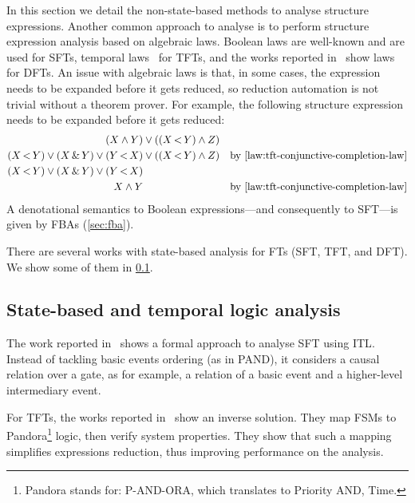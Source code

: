 \documentclass[12pt,openright,twoside,a4paper,oldfontcommands,english,brazil,draft]{abntex2}
\newcommand{\todo}[1]{\adnote{#1}}
\theoremstyle{theo}
\def\pandora{Pandora\footnote{Pandora stands for: P-AND-ORA, which translates to Priority AND, Time.}%
  \gdef\pandora{Pandora\xspace}%
  \xspace}
\newcommand{\parsin}[1]{\ensuremath\left( #1 \right)}
\def\pand{\ensuremath\operatorname{<}}
\def\sand{\ensuremath\operatorname{\&}}
\begin{document}
In this section we detail the non-state-based methods to analyse structure expressions.
Another common approach to analyse  is to perform structure expression analysis based on algebraic laws.
Boolean laws are well-known and are used for \acp{SFT}, temporal laws~\cite{Walker2009,WP2010} for \acp{TFT}, and the works reported in~\cite{Merle2010,MRL2011} show laws for \acp{DFT}.
An issue with algebraic laws is that, in some cases, the expression needs to be expanded before it gets reduced, so reduction automation is not trivial without a theorem prover.
For example, the following  structure expression needs to be expanded \cite{WP2010} before it gets reduced:
\begin{align*}
  \parsin{X \land Y} & \lor \parsin{\parsin{X \pand Y} \land Z} &\\
  \parsin{X \pand Y} \lor \parsin{X \sand Y} \lor \parsin{Y \pand X} & \lor \parsin{\parsin{X \pand Y} \land Z} & \text{by \cref{law:tft-conjunctive-completion-law}}\\
  \parsin{X \pand Y} \lor \parsin{X \sand Y} \lor \parsin{Y \pand X} & &\\
  X \land Y & & \text{by \cref{law:tft-conjunctive-completion-law}}
\end{align*}
%
A denotational semantics to Boolean expressions---and consequently to \ac{SFT}---is given by \acp{FBA} (\cref{sec:fba}).

There are several works with state-based analysis for \acp{FT} (\ac{SFT}, \ac{TFT}, and \ac{DFT}).
We show some of them in \cref{sec:ft-state-based-analysis}.

\subsection{State-based and temporal logic analysis}
\label{sec:ft-state-based-analysis}

The work reported in~\cite{STR2002} shows a formal approach to analyse \ac{SFT} using \ac{ITL}.
Instead of tackling basic events ordering (as in \ac{PAND}), it considers a causal relation over a gate, as for example, a relation of a basic event and a higher-level intermediary event.

For \acp{TFT}, the works reported in~\cite{MPW2010,MWP2012} show an inverse solution.
They map \acp{FSM} to \pandora logic, then verify system properties.
They show that such a mapping simplifies expressions reduction, thus improving performance on the analysis.
\end{document}
